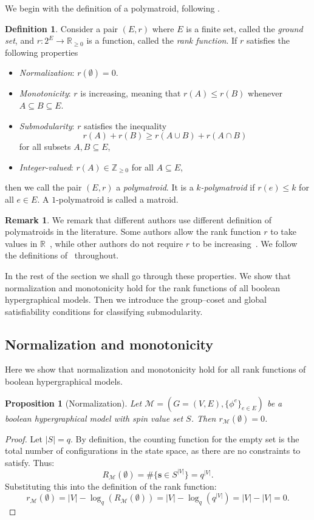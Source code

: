 \documentclass[11pt,reqno]{amsart}
\newcommand{\vecs}{\boldsymbol{s}}
\newcommand{\Mo}{\mathcal{M}}
\newcommand{\sset}{spin value set }
\theoremstyle{plain}
\newtheorem{proposition}[theorem]{Proposition}
\theoremstyle{definition}
\newtheorem{definition}[theorem]{Definition}
\newtheorem{remark}[theorem]{Remark}
\numberwithin{equation}{section}
\begin{document}
We begin with the definition of a polymatroid, following \cite{Vertigan_Whittle_1993}.
\begin{definition}
    Consider a pair $(E,r)$ where $E$ is a finite set, called the \emph{ground set}, and $r \colon 2^E \to \mathbb{R}_{\geq0}$ is a function, called the \emph{rank function}. If $r$ satisfies the following properties
    \begin{itemize}
        \item \textit{Normalization}: $r(\emptyset) = 0$.
        \item \textit{Monotonicity}: $r$ is increasing, meaning that $r(A) \leq r(B)$ whenever $A \subseteq B \subseteq E$.
        \item \textit{Submodularity}: $r$ satisfies the inequality
        \[
        r(A) + r(B) \geq r(A \cup B) + r(A \cap B)
        \]
        for all subsets $A, B \subseteq E$,
        \item \textit{Integer-valued}: $r(A) \in \mathbb{Z}_{\geq 0}$ for all $A \subseteq E$,
    \end{itemize}
    then we call the pair $(E,r)$ a \emph{polymatroid}. It is a \textit{$k$-polymatroid} if $r(e) \leq k$ for all $e \in E$. A $1$-polymatroid is called a matroid.
\end{definition}
\begin{remark}
We remark that different authors use different definition of polymatroids in the literature.
Some authors allow the rank function $r$ to take values in $\mathbb{R}$~\cite{bonin2023natural}, while other authors do not require $r$ to be increasing~\cite{kalman2013version,bernardi2022universal,guan2023deletion}.
We follow the definitions of~\cite{Vertigan_Whittle_1993} throughout.
\end{remark}
In the rest of the section we shall go through these properties. We show that normalization and monotonicity hold for the rank functions of all boolean hypergraphical models. Then we introduce the group--coset and global satisfiability conditions for classifying submodularity.

\subsection{Normalization and monotonicity}
Here we show that normalization and monotonicity hold for all rank functions of boolean hypergraphical models.

\begin{proposition}[Normalization]
    Let $\Mo = (G=(V,E), \{\phi^e\}_{e \in E})$ be a boolean hypergraphical model with \sset $S$. Then $r_{\Mo}(\emptyset) = 0$.
\end{proposition}
\begin{proof}
    Let $|S| = q$. By definition, the counting function for the empty set is the total number of configurations in the state space, as there are no constraints to satisfy. Thus:
    \[ R_{\Mo}(\emptyset) = \#\{ \vecs \in S^{|V|} \} = q^{|V|}. \]
    Substituting this into the definition of the rank function:
    \[ r_{\Mo}(\emptyset) = |V| - \log_q(R_{\Mo}(\emptyset)) = |V| - \log_q(q^{|V|}) = |V| - |V| = 0. \]
\end{proof}
\end{document}
